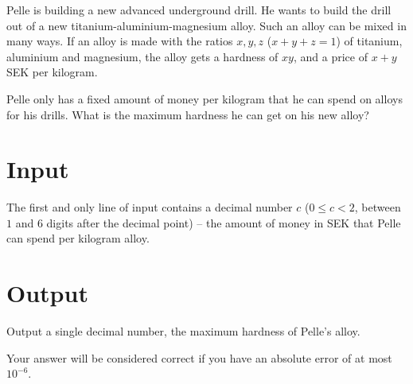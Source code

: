 Pelle is building a new advanced underground drill.
He wants to build the drill out of a new titanium-aluminium-magnesium alloy.
Such an alloy can be mixed in many ways.
If an alloy is made with the ratios $x, y, z$ ($x + y + z = 1$) of titanium, aluminium and magnesium, the alloy gets a hardness of $xy$, and a price of $x + y$ SEK per kilogram.

Pelle only has a fixed amount of money per kilogram that he can spend on alloys for his drills.
What is the maximum hardness he can get on his new alloy?

\section*{Input}
The first and only line of input contains a decimal number $c$ ($0 \le c < 2$, between $1$ and $6$ digits after the decimal point) -- the amount of money in SEK that Pelle can spend per kilogram alloy.

\section*{Output}
Output a single decimal number, the maximum hardness of Pelle's alloy.

Your answer will be considered correct if you have an absolute error of at most ${10}^{-6}$.
